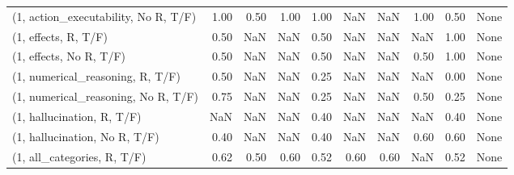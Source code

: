 \begin{table*}[h!]
\begin{adjustbox}{width=2\columnwidth,center}
\begin{tabular}{lrrr|rrr|rrr}
(1, action\_executability, No R, T/F) &                      1.00 &                  0.50 &                      1.00 &                          1.00 &                       NaN &                           NaN &                                   1.00 &                               0.50 &                                  None \\
(1, effects, R, T/F)                 &                      0.50 &                   NaN &                       NaN &                          0.50 &                       NaN &                           NaN &                                    NaN &                               1.00 &                                  None \\
(1, effects, No R, T/F)              &                      0.50 &                   NaN &                       NaN &                          0.50 &                       NaN &                           NaN &                                   0.50 &                               1.00 &                                  None \\
(1, numerical\_reasoning, R, T/F)     &                      0.50 &                   NaN &                       NaN &                          0.25 &                       NaN &                           NaN &                                    NaN &                               0.00 &                                  None \\
(1, numerical\_reasoning, No R, T/F)  &                      0.75 &                   NaN &                       NaN &                          0.25 &                       NaN &                           NaN &                                   0.50 &                               0.25 &                                  None \\
(1, hallucination, R, T/F)           &                       NaN &                   NaN &                       NaN &                          0.40 &                       NaN &                           NaN &                                    NaN &                               0.40 &                                  None \\
(1, hallucination, No R, T/F)        &                      0.40 &                   NaN &                       NaN &                          0.40 &                       NaN &                           NaN &                                   0.60 &                               0.60 &                                  None \\
(1, all\_categories, R, T/F)          &                      0.62 &                  0.50 &                      0.60 &                          0.52 &                      0.60 &                          0.60 &                                    NaN &                               0.52 &                                  None \\

\end{tabular}
\end{adjustbox}
\end{table*}
